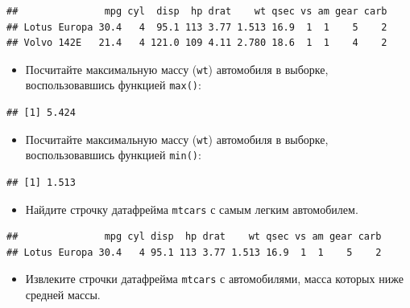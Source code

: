 \documentclass[]{book}
\providecommand{\tightlist}{%
  \setlength{\itemsep}{0pt}\setlength{\parskip}{0pt}}
\begin{document}
\begin{verbatim}
##               mpg cyl  disp  hp drat    wt qsec vs am gear carb
## Lotus Europa 30.4   4  95.1 113 3.77 1.513 16.9  1  1    5    2
## Volvo 142E   21.4   4 121.0 109 4.11 2.780 18.6  1  1    4    2
\end{verbatim}

\begin{itemize}
\tightlist
\item
  Посчитайте максимальную массу (\texttt{wt}) автомобиля в выборке,
  воспользовавшись функцией \texttt{max()}:
\end{itemize}

\begin{verbatim}
## [1] 5.424
\end{verbatim}

\begin{itemize}
\tightlist
\item
  Посчитайте максимальную массу (\texttt{wt}) автомобиля в выборке,
  воспользовавшись функцией \texttt{min()}:
\end{itemize}

\begin{verbatim}
## [1] 1.513
\end{verbatim}

\begin{itemize}
\tightlist
\item
  Найдите строчку датафрейма \texttt{mtcars} с самым легким автомобилем.
\end{itemize}

\begin{verbatim}
##               mpg cyl disp  hp drat    wt qsec vs am gear carb
## Lotus Europa 30.4   4 95.1 113 3.77 1.513 16.9  1  1    5    2
\end{verbatim}

\begin{itemize}
\tightlist
\item
  Извлеките строчки датафрейма \texttt{mtcars} с автомобилями, масса
  которых ниже средней массы.
\end{itemize}
\end{document}
